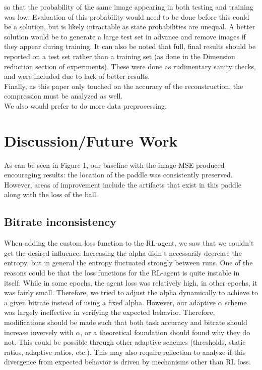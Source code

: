 so that the probability of the same image appearing in both testing and training
was low. Evaluation of this probability would need to be done before this could
be a solution, but is likely intractable as state probabilities are unequal. A
better solution would be to generate a large test set in advance and remove
images if they appear during training. It can also be noted that full, final
results should be reported on a test set rather than a training set (as done in
the Dimension reduction section of experiments). These were done as rudimentary
sanity checks, and were included due to lack of better results.\\
Finally, as this paper only touched on the accuracy of the reconstruction, the
compression must be analyzed as well. \\
We also would prefer to do more data preprocessing.


\section{Discussion/Future Work}
As can be seen in Figure 1, our baseline with the image MSE produced encouraging
results: the location of the paddle was consistently preserved. However, areas
of improvement include the artifacts that exist in this paddle along with the
loss of the ball.\\
\subsection{Bitrate inconsistency}
When adding the custom loss function to the RL-agent, we saw that we couldn't
get the desired influence. Increasing the alpha didn't necessarily decrease the
entropy, but in general the entropy fluctuated strongly between runs. One
of the reasons could be that the loss functions for the RL-agent is quite
instable in itself. While in some epochs, the agent loss was relatively high, in
other epochs, it was fairly small. Therefore, we tried to adjust the alpha
dynamically to achieve to a given bitrate instead of using a fixed alpha.
However, our adaptive $\alpha$ scheme was largely ineffective in verifying the
expected behavior. Therefore, modifications should be made such that both task
accuracy and bitrate should increase inversely with $\alpha$, or a theoretical
foundation should found why they do not. This could be possible through other
adaptive schemes (thresholds, static ratios, adaptive ratios, etc.). This may
also require reflection to analyze if this divergence from expected behavior is
driven by mechanisms other than RL loss. \\

